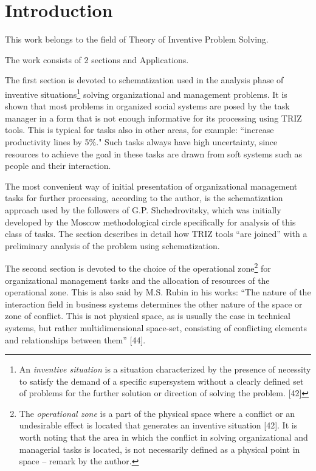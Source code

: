 \section{Introduction}
This work belongs to the field of Theory of Inventive Problem Solving.

The work consists of 2 sections and Applications.

The first section is devoted to schematization used in the analysis phase of
inventive situations\footnote{An \emph{inventive situation} is a situation
  characterized by the presence of necessity to satisfy the demand of a
  specific supersystem without a clearly defined set of problems for the
  further solution or direction of solving the problem. [42]} solving
organizational and management problems. It is shown that most problems in
organized social systems are posed by the task manager in a form that is not
enough informative for its processing using TRIZ tools.  This is typical for
tasks also in other areas, for example: “increase productivity lines by 5\%."
Such tasks always have high uncertainty, since resources to achieve the goal
in these tasks are drawn from soft systems such as people and their
interaction.

The most convenient way of initial presentation of organizational management
tasks for further processing, according to the author, is the schematization
approach used by the followers of G.P. Shchedrovitsky, which was initially
developed by the Moscow methodological circle specifically for analysis of
this class of tasks. The section describes in detail how TRIZ tools “are
joined” with a preliminary analysis of the problem using schematization.

The second section is devoted to the choice of the operational
zone\footnote{The \emph{operational zone} is a part of the physical space
  where a conflict or an undesirable effect is located that generates an
  inventive situation [42]. It is worth noting that the area in which the
  conflict in solving organizational and managerial tasks is located, is not
  necessarily defined as a physical point in space -- remark by the author.}
for organizational management tasks and the allocation of resources of the
operational zone. This is also said by M.S.  Rubin in his works: “The nature
of the interaction field in business systems determines the other nature of
the space or zone of conflict. This is not physical space, as is usually the
case in technical systems, but rather multidimensional space-set, consisting
of conflicting elements and relationships between them” [44].

